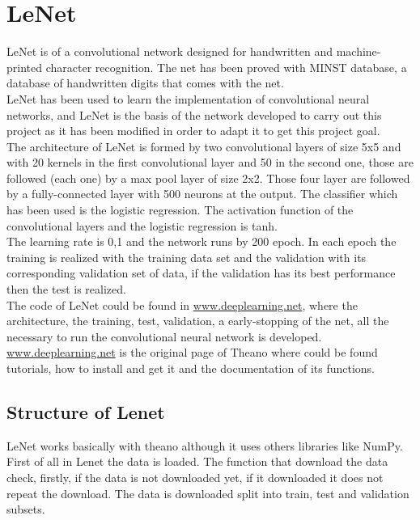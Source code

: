 \section{LeNet}
LeNet is of a convolutional network designed for handwritten and machine-printed character recognition. The net has been proved with MINST database, a database of handwritten digits that comes with the net.\\ 

LeNet has been used to learn the implementation of convolutional neural networks, and LeNet is the basis of the network developed to carry out this project as it has been modified in order to adapt it to get this project goal.\\

The architecture of LeNet is formed by two convolutional layers of size 5x5 and with 20 kernels in the first convolutional layer and 50 in the second one, those are followed (each one) by a max pool layer of size 2x2. Those four layer are followed by a fully-connected layer with 500 neurons at the output. The classifier which has been used is the logistic regression. The activation function of the convolutional layers and the logistic regression is tanh.\\

The learning rate is 0,1 and the network runs by 200 epoch. In each epoch the training is realized with the training data set and the validation with its corresponding validation set of data, if the validation has its best performance then the test is realized.\\ 

The code of LeNet could be found in \url{www.deeplearning.net}, where the architecture, the training, test, validation, a early-stopping of the net, all the necessary to run the convolutional neural network is developed.\\

\url{www.deeplearning.net} is the original page of Theano where could be found tutorials, how to install and get it and the documentation of its functions.\\

\subsection{Structure of Lenet}
LeNet works basically with theano although it uses others libraries like NumPy.\\

First of all in Lenet the data is loaded. The function that download the data check, firstly, if the data is not downloaded yet, if it downloaded it does not repeat the download. The data is downloaded split into train, test and validation subsets.\\


